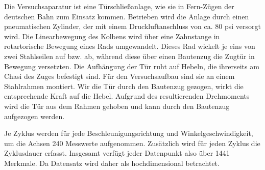 Die Versuchsaparatur ist eine Türschließanlage, wie sie in Fern-Zügen der deutschen Bahn zum Einsatz kommen. Betrieben wird die Anlage durch einen pneumatischen Zylinder, der mit einem Druckluftanschluss von ca. 80 psi versorgt wird. Die Linearbewegung des Kolbens wird über eine Zahnstange in rotartorische Bewegung eines Rads umgewandelt. Dieses Rad wickelt je eins von zwei Stahlseilen auf bzw. ab, während diese über einen Bautenzug die Zugtür in Bewegung versetzten. Die Aufhängung der Tür ruht auf Hebeln, die ihrerseits am Chasi des Zuges befestigt sind. Für den Versuchsaufbau sind sie an einem Stahlrahmen montiert. Wir die Tür durch den Bautenzug gezogen, wirkt die entsprechende Kraft auf die Hebel. Aufgrund des resultierenden Drehmoments wird die Tür aus dem Rahmen gehoben und kann durch den Bautenzug aufgezogen werden.

Je Zyklus werden für jede Beschleunigungsrichtung und Winkelgeschwindigkeit, um die Achsen 240 Messwerte aufgenommen. Zusätzlich wird für jeden Zyklus die Zyklusdauer erfasst. Insgesamt verfügt jeder Datenpunkt also über 1441 Merkmale. Da Datensatz wird daher als hochdimensional betrachtet.